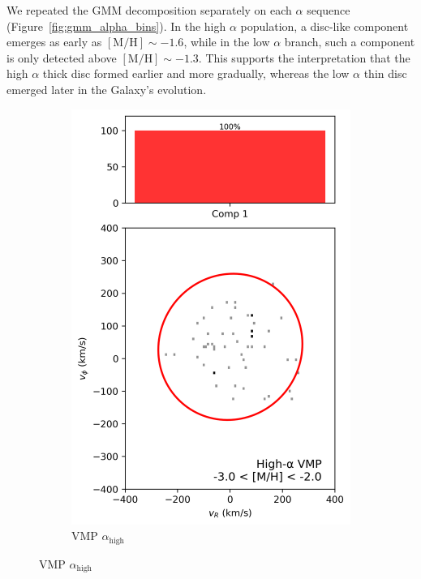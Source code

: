 \documentclass[a4paper,10pt]{article}
\begin{document}
\begin{multicols}{2}
We repeated the GMM decomposition separately on each $\alpha$ sequence (Figure~\ref{fig:gmm_alpha_bins}). 
In the high $\alpha$ population, a disc-like component emerges as early as $\mathrm{[M/H]} \sim -1.6$, 
while in the low $\alpha$ branch, such a component is only detected above $\mathrm{[M/H]} \sim -1.3$. 
This supports the interpretation that the high $\alpha$ thick disc formed earlier and more gradually, 
whereas the low $\alpha$ thin disc emerged later in the Galaxy’s evolution.

\begin{figure}[H]
  \centering
  \begin{subfigure}[t]{0.24\linewidth}
    \includegraphics[width=\linewidth]{../figures/gmm_vmp_high_alpha_k1.png}
    \caption{VMP $\alpha_{\mathrm{high}}$}
  \end{subfigure}

\end{figure}
\end{multicols}
\end{document}
